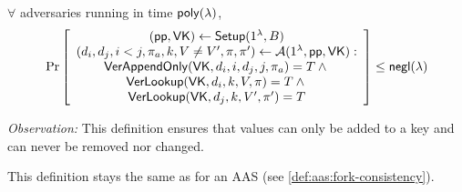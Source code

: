 \begin{definition}
\label{def:aad:appendonly-security}
$\forall$ adversaries \Adv running in time $\mathsf{poly}(\lambda)$,
\begin{align*}
\Pr \left[ \begin{array}{c}
    (\mathsf{pp},\mathsf{VK}) \leftarrow \mathsf{Setup}(1^\lambda, B)\\
    (d_i,d_j,i<j,\pi_a, k,V\ne V',\pi,\pi') \leftarrow \mathcal{A}(1^\lambda, \mathsf{pp}, \mathsf{VK})
    : \\
    {\mathsf{VerAppendOnly}(\mathsf{VK}, d_i, i, d_j, j, \pi_a) = T} \wedge {}\\
    {\mathsf{VerLookup}(\mathsf{VK}, d_i, k, V , \pi )  = T} \wedge {}\\
    {\mathsf{VerLookup}(\mathsf{VK}, d_j, k, V', \pi') = T}
\end{array} \right] \le \mathsf{negl}(\lambda)
\end{align*}
\end{definition}

\noindent \textit{Observation:}
This definition ensures that values can only be added to a key and can never be removed nor changed.

\begin{definition}
This definition stays the same as for an AAS (see \cref{def:aas:fork-consistency}).
\end{definition}